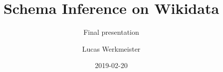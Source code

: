 \documentclass[aspectratio=169]{beamer}
\title{Schema Inference on Wikidata}
\subtitle{Final presentation}
\author{Lucas Werkmeister}
\date{2019-02-20}
\begin{document}
\frame{\titlepage}
\end{document}
